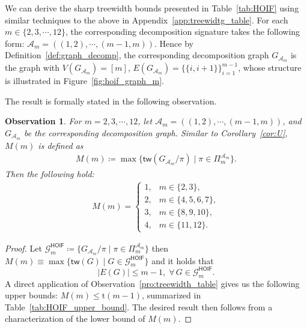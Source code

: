 \documentclass[sn-mathphys, natbib=false]{sn-jnl}
\theoremstyle{plain}
\newtheorem{observation}{Observation}
\theoremstyle{definition}
\newcommand{\partition}{\Pi}
\newcommand{\partitionp}[1]{\partition_{#1}}
\newcommand{\treewidthp}[1]{\mathsf{tw}(#1)}
\newcommand{\graphset}{\mathcal{G}}
\def\calA{\mathcal{A}}
\begin{document}
\begin{bibunit}[agsm]
We can derive the sharp treewidth bounds presented in Table~\ref{tab:HOIF} using similar techniques to the above in Appendix~\ref{app:treewidtg_table}. For each $m \in \{2, 3, \cdots, 12\}$, the corresponding decomposition signature takes the following form: $\calA_{m} = ((1, 2), \cdots, (m - 1, m))$. Hence by Definition~\ref{def:graph_decomp}, the corresponding decomposition graph $G_{\calA_{m}}$ is the graph with $V(G_{\calA_{m}}) = [m]$, $E(G_{\calA_{m}}) = \{ \{i, i+1\} \}_{i=1}^{m-1}$, whose structure is illustrated in Figure~\ref{fig:hoif_graph_m}.

The result is formally stated in the following observation. 
\begin{observation}
\label{obs:HOIF}    
    For $m = 2,3,\cdots, 12$, let $\calA_{m} = ((1,2),\cdots,(m-1,m))$, and $G_{\calA_m}$ be the corresponding decomposition graph. Similar to Corollary~\ref{cor:U}, $M(m)$ is defined as 
    \begin{align*}
        M(m) \coloneqq \max \{ \treewidthp{G_{\calA_m} /\pi} \mid \pi \in \partitionp{m}^{\calA_m}\}. 
    \end{align*}
    Then the following hold:
    \begin{equation}
    \label{HOIF_M}
    \begin{split}
    M (m) = \left\{ \begin{array}{ll}
    1, & m \in \{2, 3\}, \\
    2, & m \in \{4, 5, 6, 7\}, \\
    3, & m \in \{8, 9, 10\}, \\
    4, & m \in \{11, 12\}.
    \end{array} \right.
    \end{split}
    \end{equation}
\end{observation}

\begin{proof}
Let $\graphset^{\mathsf{HOIF}}_{m} \coloneqq \{ G_{\calA_m} /\pi \mid \pi \in \partitionp{m}^{\calA_m} \}$ then $M(m) \equiv \max \{ \treewidthp{G} \mid G \in \graphset^{\mathsf{HOIF}}_{m} \}$ and it holds that
\begin{equation*}
| E(G) | \leq m-1, \; \forall \, G \in \graphset^{\mathsf{HOIF}}_{m}.
\end{equation*}
A direct application of Observation~\ref{pro:treewidth_table} gives us the following upper bounds: $M(m) \le \mathrm{t}(m-1)$, summarized in Table~\ref{tab:HOIF_upper_bound}. The desired result then follows from a characterization of the lower bound of $M (m)$.


\end{proof}
\end{bibunit}
\end{document}
